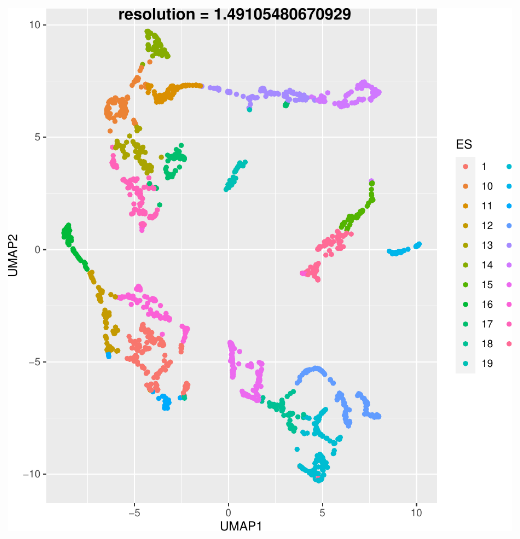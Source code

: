 \documentclass{beamer}
\begin{document}
{\begin{columns}
\begin{column}{0.50\textwidth}
			\includegraphics[width=\textwidth]{umap_ES.pdf}
		\end{column}
	\end{columns}
}
\end{document}
